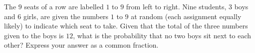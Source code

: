 The $9$ seats of a row are labelled $1$ to $9$ from left to right. Nine students, $3$ boys and $6$ girls, are given the numbers $1$ to $9$ at random (each assignment equally likely) to indicate which seat to take. Given that the total of the three numbers given to the boys is $12$, what is the probability that no two boys sit next to each other? Express your answer as a common fraction.
